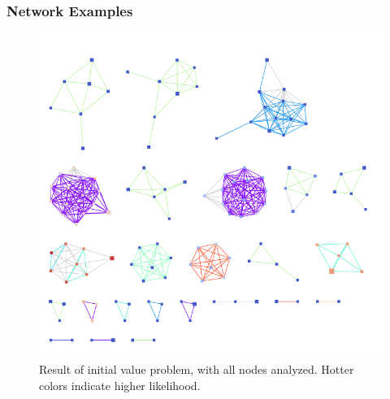 \documentclass{beamer}
\begin{document}
\begin{frame}
\frametitle{Network Examples}
	\begin{figure}
	\begin{center}
		\includegraphics[scale = 0.25]{ranked_ivp.png}	
	\end{center}
	\caption{Result of initial value problem, with all nodes analyzed. Hotter colors indicate higher likelihood.}
\end{figure}
\end{frame}
\end{document}
